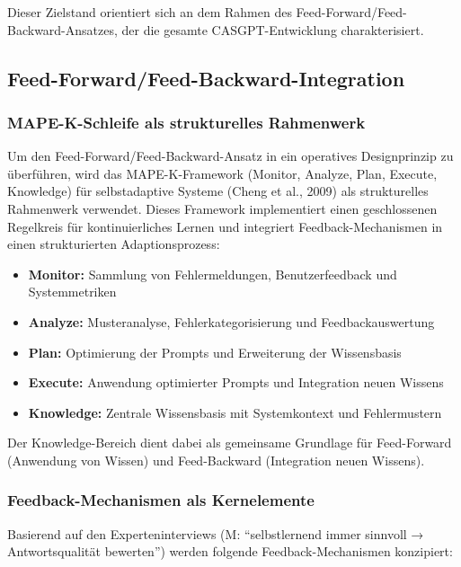 \documentclass[
  a4paper,
  12pt,
  oneside,
  open=any,
  BCOR=12mm,
  DIV=14,
  parskip=half*,
  headsepline,
  footsepline,
  pointlessnumbers,
  liststotoc,
  numbers=noenddot,
  listof=totoc]{scrartcl}
\begin{document}
Dieser Zielstand orientiert sich an dem Rahmen des
Feed-Forward/Feed-Backward-Ansatzes, der die gesamte CASGPT-Entwicklung
charakterisiert.

\subsection{Feed-Forward/Feed-Backward-Integration}\label{feed-forwardfeed-backward-integration}

\subsubsection{MAPE-K-Schleife als strukturelles
Rahmenwerk}\label{mape-k-schleife-als-strukturelles-rahmenwerk}

Um den Feed-Forward/Feed-Backward-Ansatz in ein operatives Designprinzip
zu überführen, wird das MAPE-K-Framework (Monitor, Analyze, Plan,
Execute, Knowledge) für selbstadaptive Systeme (Cheng et al., 2009) als
strukturelles Rahmenwerk verwendet. Dieses Framework implementiert einen
geschlossenen Regelkreis für kontinuierliches Lernen und integriert
Feedback-Mechanismen in einen strukturierten Adaptionsprozess:

\begin{itemize}
\item
  \textbf{Monitor:} Sammlung von Fehlermeldungen, Benutzerfeedback und
  Systemmetriken
\item
  \textbf{Analyze:} Musteranalyse, Fehlerkategorisierung und
  Feedbackauswertung
\item
  \textbf{Plan:} Optimierung der Prompts und Erweiterung der
  Wissensbasis
\item
  \textbf{Execute:} Anwendung optimierter Prompts und Integration neuen
  Wissens
\item
  \textbf{Knowledge:} Zentrale Wissensbasis mit Systemkontext und
  Fehlermustern
\end{itemize}

Der Knowledge-Bereich dient dabei als gemeinsame Grundlage für
Feed-Forward (Anwendung von Wissen) und Feed-Backward (Integration neuen
Wissens).

\subsubsection{Feedback-Mechanismen als
Kernelemente}\label{feedback-mechanismen-als-kernelemente}

Basierend auf den Experteninterviews (M: ``selbstlernend immer sinnvoll
→ Antwortsqualität bewerten'') werden folgende Feedback-Mechanismen
konzipiert:
\end{document}
